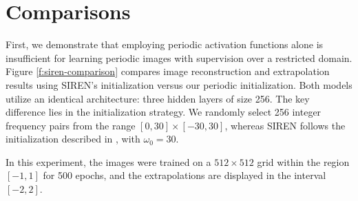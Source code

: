 

\section{Comparisons}


First, we demonstrate that employing periodic activation functions alone is insufficient for learning periodic images with supervision over a restricted domain. Figure \ref{f:siren-comparison} compares image reconstruction and extrapolation results using SIREN’s initialization versus our periodic initialization. Both models utilize an identical architecture: three hidden layers of size 256. The key difference lies in the initialization strategy. We randomly select 256 integer frequency pairs from the range $[0, 30] \times [-30, 30]$, whereas SIREN follows the initialization described in \cite{sitzmann2019siren}, with $\omega_0 = 30$. 

In this experiment, the images were trained on a $512 \times 512$ grid within the region $[-1, 1]$ for 500 epochs, and the extrapolations are displayed in the interval $[-2, 2]$.


